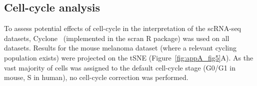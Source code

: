 \subsection{Cell-cycle analysis}
To assess potential effects of cell-cycle in the interpretation of the scRNA-seq datasets, Cyclone~\citep{Scialdone2015-tw} (implemented in the scran R package) was used on all datasets. Results for the mouse melanoma dataset (where a relevant cycling population exists) were projected on the tSNE (Figure~\ref{fig:appA_fig5}A). As the vast majority of cells was assigned to the default cell-cycle stage (G0/G1 in mouse, S in human), no cell-cycle correction was performed.
